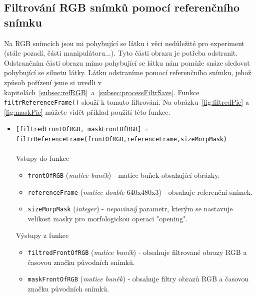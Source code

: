 \documentclass[10pt,a4paper,titlepage,oneside]{report}
\begin{document}
\subsection{Filtrování RGB snímků pomocí referenčního snímku}
\label{subsec:matfiltr}
Na RGB snímcích jsou mi pohybující se látku i věci nedůležité pro experiment (stále pozadí, části manipulátoru...). Tyto části obrazu je potřeba odstranit. Odstraněním části obrazu mimo pohybující se látku nám pomůže snáze sledovat pohybující se siluetu látky. Látku odstraníme pomocí referenčního snímku, jehož způsob pořízení jsme si uvedli v kapitolách~\ref{subsec:refRGB}~a~\ref{subsec:processFiltrSave}. Funkce \verb|filtrReferenceFrame()| slouží k tomuto filtrování. Na obrázku~\ref{fig:filtredPic} a \ref{fig:maskPic} můžete vidět příklad použití této funkce.
\begin{itemize}
  	\item \verb|[filtredFrontOfRGB, maskFrontOfRGB] =|\\ \verb|filtrReferenceFrame(frontOfRGB,referenceFrame,sizeMorpMask)|\\
\\
    		Vstupy do funkce
        		\begin{itemize}
  			\item \verb|frontOfRGB| (\textit{matice buněk}) - matice buňek obsahující obrázky.
  			\item \verb|referenceFrame| (\textit{matice double} 640x480x3) - obsahuje referenční snímek.
  			\item \verb|sizeMorpMask| (\textit{integer}) - \textit{nepovinný} parametr, kterým se nastavuje velikost masky pro morfologickou  operaci "opening"\cite{hlavacOpen}.
    			\end{itemize}
    		Výstupy z funkce
        		\begin{itemize}
        		\item \verb|filtredFrontOfRGB| (\textit{matice buněk}) - obsahuje filtrované obrazy RGB a časovou značku původních snímků.
  			\item \verb|maskFrontOfRGB| (\textit{matice buněk}) - obsahuje filtry obrazů RGB a časovou značku původních snímků.
    			\end{itemize}
    \end{itemize}
\end{document}
